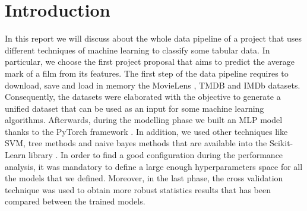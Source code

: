 \documentclass[../main]{subfiles}
\begin{document}
\chapter{Introduction}
In this report we will discuss about the whole data pipeline of a project that uses different techniques of machine learning to classify some tabular data.
In particular, we choose the first project proposal that aims to predict the average mark of a film from its features.
The first step of the data pipeline requires to download, save and load in memory the MovieLens \cite{site:movielens-datasets}, TMDB \cite{site:tmdb-api-overview} and IMDb \cite{site:imdb-datasets} datasets.  
Consequently, the datasets were elaborated with the objective to generate a unified dataset that can be used as an input for some machine learning algorithms.
Afterwards, during the modelling phase we built an MLP model thanks to the PyTorch framework \cite{NEURIPS2019_9015}.
In addition, we used other techniques like SVM, tree methods and naive bayes methods that are available into the Scikit-Learn library \cite{scikit-learn}. 
In order to find a good configuration during the performance analysis, it was mandatory to define a large enough hyperparameters space for all the models that we defined.
Moreover, in the last phase, the cross validation technique was used to obtain more robust statistics results that has been compared between the trained models.
\end{document}
